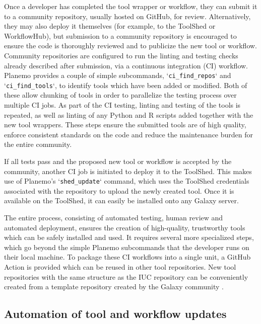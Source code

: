 Once a developer has completed the tool wrapper or workflow, they can
submit it to a community repository, usually hosted on GitHub, for
review. Alternatively, they may also deploy it themselves (for example,
to the ToolShed or WorkflowHub), but submission to a community
repository is encouraged to ensure the code is thoroughly reviewed and
to publicize the new tool or workflow. Community repositories are
configured to run the linting and testing checks already described after
submission, via a continuous integration (CI) workflow. Planemo provides
a couple of simple subcommands, `\texttt{ci\_find\_repos}` and
`\texttt{ci\_find\_tools}`, to identify tools which have been added or
modified. Both of these allow chunking of tools in order to parallelize
the testing process over multiple CI jobs. As part of the CI testing,
linting and testing of the tools is repeated, as well as linting of any
Python and R scripts added together with the new tool wrappers. These
steps ensure the submitted tools are of high quality, enforce consistent
standards on the code and reduce the maintenance burden for the entire
community.

If all tests pass and the proposed new tool or workflow is accepted by
the community, another CI job is initiated to deploy it to the ToolShed.
This makes use of Planemo's `\texttt{shed\_update}` command, which uses
the ToolShed credentials associated with the repository to upload the
newly created tool. Once it is available on the ToolShed, it can easily
be installed onto any Galaxy server.

The entire process, consisting of automated testing, human review and
automated deployment, ensures the creation of high-quality, trustworthy
tools which can be safely installed and used. It requires several more
specialized steps, which go beyond the simple Planemo subcommands that
the developer runs on their local machine. To package these CI workflows
into a single unit, a GitHub Action is provided \cite{planemo_ci_action} which can be
reused in other tool repositories. New tool repositories with the same
structure as the IUC repository can be conveniently created from a
template repository created by the Galaxy community \cite{Galaxy_tool_repository_template_2022}.

\subsection*{Automation of tool and workflow updates}

